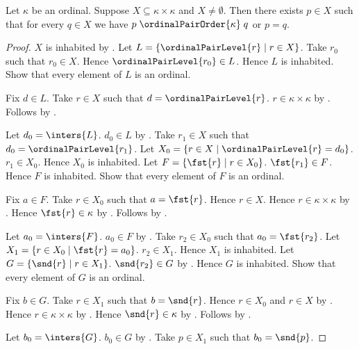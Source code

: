 \begin{proposition}\label{ordinal_pair_order_has_least}
    Let $\kappa$ be an ordinal.
    Suppose $X\subseteq\kappa\times\kappa$ and $X\neq\emptyset$.
    Then there exists $p\in X$ such that for every $q\in X$ we have
        $p\mathrel{\ordinalPairOrder{\kappa}}q$ or $p=q$.
\end{proposition}
\begin{proof}
    $X$ is inhabited by .
    Let $L=\{\ordinalPairLevel{r}\mid r\in X\}$.
    Take $r_0$ such that $r_0\in X$.
    Hence $\ordinalPairLevel{r_0}\in L$.
    Hence $L$ is inhabited.
    Show that every element of $L$ is an ordinal.
    \begin{subproof}
        Fix $d\in L$.
        Take $r\in X$ such that $d=\ordinalPairLevel{r}$.
        $r\in\kappa\times\kappa$ by .
        Follows by .
    \end{subproof}
    Let $d_0=\inters{L}$.
    $d_0\in L$ by .
    Take $r_1\in X$ such that
        $d_0=\ordinalPairLevel{r_1}$.
    Let $X_0=\{r\in X\mid \ordinalPairLevel{r}=d_0\}$.
    $r_1\in X_0$.
    Hence $X_0$ is inhabited.
    Let $F=\{\fst{r}\mid r\in X_0\}$.
    $\fst{r_1}\in F$.
    Hence $F$ is inhabited.
    Show that every element of $F$ is an ordinal.
    \begin{subproof}
        Fix $a\in F$.
        Take $r\in X_0$ such that $a=\fst{r}$.
        Hence $r\in X$.
        Hence $r\in\kappa\times\kappa$ by .
        Hence $\fst{r}\in\kappa$ by .
        Follows by .
    \end{subproof}
    Let $a_0=\inters{F}$.
    $a_0\in F$ by .
    Take $r_2\in X_0$ such that $a_0=\fst{r_2}$.
    Let $X_1=\{r\in X_0\mid \fst{r}=a_0\}$.
    $r_2\in X_1$.
    Hence $X_1$ is inhabited.
    Let $G=\{\snd{r}\mid r\in X_1\}$.
    $\snd{r_2}\in G$ by \auto.
    Hence $G$ is inhabited.
    Show that every element of $G$ is an ordinal.
    \begin{subproof}
        Fix $b\in G$.
        Take $r\in X_1$ such that $b=\snd{r}$.
        Hence $r\in X_0$ and $r\in X$ by \auto.
        Hence $r\in\kappa\times\kappa$ by .
        Hence $\snd{r}\in\kappa$ by .
        Follows by .
    \end{subproof}
    Let $b_0=\inters{G}$.
    $b_0\in G$ by .
    Take $p\in X_1$ such that $b_0=\snd{p}$.

\end{proof}
